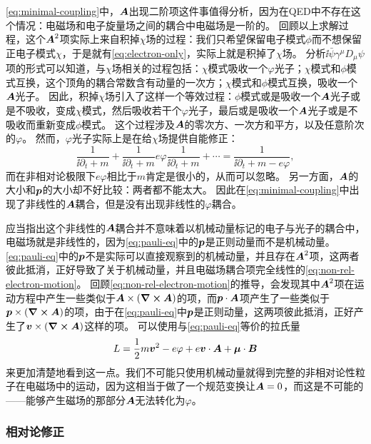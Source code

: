 \eqref{eq:minimal-coupling}中，$\vb*{A}$出现二阶项这件事值得分析，因为在QED中不存在这个情况：电磁场和电子旋量场之间的耦合中电磁场是一阶的。
回顾以上求解过程，这个$\vb*{A}^2$项实际上来自积掉$\chi$场的过程：我们只希望保留电子模式$\phi$而不想保留正电子模式$\chi$，于是就有\eqref{eq:electron-only}，实际上就是积掉了$\chi$场。
分析$\ii \bar{\psi} \gamma^\mu D_\mu \psi$项的形式可以知道，与$\chi$场相关的过程包括：$\chi$模式吸收一个$\varphi$光子；$\chi$模式和$\phi$模式互换，这个顶角的耦合常数含有动量的一次方；$\chi$模式和$\phi$模式互换，吸收一个$\vb*{A}$光子。
因此，积掉$\chi$场引入了这样一个等效过程：$\phi$模式或是吸收一个$\vb*{A}$光子或是不吸收，变成$\chi$模式，然后吸收若干个$\varphi$光子，最后或是吸收一个$\vb*{A}$光子或是不吸收而重新变成$\phi$模式。
这个过程涉及$\vb*{A}$的零次方、一次方和平方，以及任意阶次的$\varphi$。
然而，$\varphi$光子实际上是在给$\chi$场提供自能修正：
\[
    \frac{1}{\ii \partial_t + m} + \frac{1}{\ii \partial_t + m} e \varphi \frac{1}{\ii \partial_t + m} + \cdots = \frac{1}{\ii \partial_t + m - e \varphi},
\]
而在非相对论极限下$e \varphi$相比于$m$肯定是很小的，从而可以忽略。
另一方面，$\vb*{A}$的大小和$\vb*{p}$的大小却不好比较：两者都不能太大。
因此在\eqref{eq:minimal-coupling}中出现了非线性的$\vb*{A}$耦合，但是没有出现非线性的$\varphi$耦合。

应当指出这个非线性的$\vb*{A}$耦合并不意味着以机械动量标记的电子与光子的耦合中，电磁场就是非线性的，因为\eqref{eq:pauli-eq}中的$\vb*{p}$是正则动量而不是机械动量。
\eqref{eq:pauli-eq}中的$\vb*{p}$不是实际可以直接观察到的机械动量，并且存在$\vb*{A}^2$项，这两者彼此抵消，正好导致了关于机械动量，并且电磁场耦合项完全线性的\eqref{eq:non-rel-electron-motion}。
回顾\eqref{eq:non-rel-electron-motion}的推导，会发现其中$\vb*{A}^2$项在运动方程中产生一些类似于$\vb*{A} \times (\curl{\vb*{A}})$的项，而$\vb*{p} \cdot \vb*{A}$项产生了一些类似于$\vb*{p} \times (\curl{\vb*{A}})$的项，由于在\eqref{eq:pauli-eq}中$\vb*{p}$是正则动量，这两项彼此抵消，正好产生了$\vb*{v} \times (\curl{\vb*{A}})$这样的项。
可以使用与\eqref{eq:pauli-eq}等价的拉氏量
\begin{equation}
    L = \frac{1}{2} m \vb*{v}^2 - e \varphi + e \vb*{v} \cdot \vb*{A} + \vb*{\mu} \cdot \vb*{B}
\end{equation}
来更加清楚地看到这一点。我们不可能只使用机械动量就得到完整的非相对论性粒子在电磁场中的运动，因为这相当于做了一个规范变换让$\vb*{A}=0$，而这是不可能的——能够产生磁场的那部分$\vb*{A}$无法转化为$\varphi$。

\subsubsection{相对论修正}

